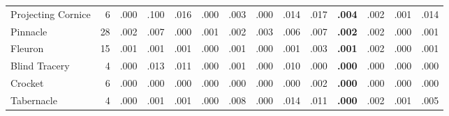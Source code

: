 \documentclass[lineno,pdflatex,sn-mathphys-num]{sn-jnl}%
\theoremstyle{thmstyleone}%
\theoremstyle{thmstyletwo}%
\theoremstyle{thmstylethree}%
\begin{document}
\begin{appendices}
\begin{table}[!htbp]
\begin{tabular}{@{}lrcccccccccccc@{}}
Projecting Cornice & 6 & .000 & .100 & .016 & .000 & .003 & .000 & .014 & .017 & \textbf{.004} & .002 & .001 & .014 \\
Pinnacle & 28 & .002 & .007 & .000 & .001 & .002 & .003 & .006 & .007 & \textbf{.002} & .002 & .000 & .001 \\
Fleuron & 15 & .001 & .001 & .001 & .000 & .001 & .000 & .001 & .003 & \textbf{.001} & .002 & .000 & .001 \\
Blind Tracery & 4 & .000 & .013 & .011 & .000 & .001 & .000 & .010 & .000 & \textbf{.000} & .000 & .000 & .000 \\
Crocket & 6 & .000 & .000 & .000 & .000 & .000 & .000 & .000 & .002 & \textbf{.000} & .000 & .000 & .000 \\
Tabernacle & 4 & .000 & .001 & .001 & .000 & .008 & .000 & .014 & .011 & \textbf{.000} & .002 & .001 & .005 \\
\bottomrule
\end{tabular}
\end{table}


\end{appendices}
\end{document}
